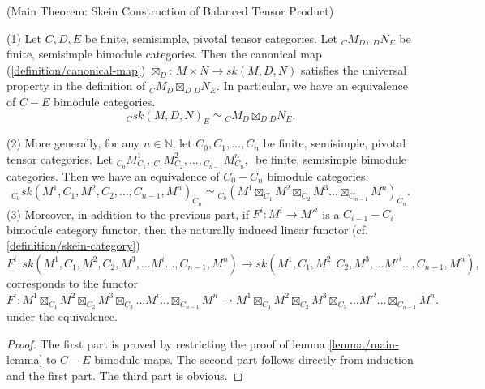 \begin{theorem} (Main Theorem: Skein Construction of Balanced Tensor Product) \label{theorem/main-theorem}

  \noindent (1) Let $C, D, E$ be finite, semisimple, pivotal tensor
  categories. Let ${}_{C}M_{D}, \, {}_{D}N_{E}$ be finite, semisimple bimodule
  categories. Then the canonical map (\ref{definition/canonical-map})
  $\boxtimes_{D}$: $M \times N \to sk(M,D,N)$ satisfies the universal property
  in the definition of ${}_{C}M_{D} \boxtimes_{D} {}_{D}N_{E}$. In particular,
  we have an equivalence of $C-E$ bimodule categories.
  \[
    {}_{C}sk(M,D,N)_{E} \simeq {}_{C}M_{D} \boxtimes_{D} {}_{D}N_{E}.
  \]

  \noindent (2) More generally, for any $n \in \mathbb{N}$, let
  $C_{0}, C_{1}, \ldots, C_{n}$ be finite, semisimple, pivotal tensor categories. Let
  ${}_{C_{0}}M^{1}_{C_{1}}, \, {}_{C_{1}}M^{2}_{C_{2}}, \ldots,
  {}_{C_{n-1}}M^{n}_{C_{n}}, \,
  $ be finite, semisimple bimodule categories.
  Then we
  have an equivalence of $C_{0}-C_{n}$ bimodule categories.
  \[
    {}_{C_{0}}sk(M^{1},C_{1},M^{2},C_{2}, \ldots, C_{n-1}, M^{n})_{C_{n}}
    \simeq
    {}_{C_{0}}(M^{1}
    \boxtimes_{C_{1}}
    M^{2}
    \boxtimes_{C_{2}}
    M^{3}
    \ldots
    \boxtimes_{C_{n-1}}
    M^{n})_{C_{n}}.
  \]
  \noindent (3) Moreover, in addition to the previous part, if
  $F^{i}: M^{i} \to M'^{i}$ is a $C_{i-1}-C_{i}$ bimodule category functor,
  then the naturally induced linear functor (cf.
  \ref{definition/skein-category})
  \[
    F^{i}:
    sk(M^{1}, C_{1}, M^{2}, C_{2}, M^{3}, \ldots M^{i} \ldots, C_{n-1}, M^{n})
    \to
    sk(M^{1}, C_{1}, M^{2}, C_{2}, M^{3}, \ldots M'^{i} \ldots, C_{n-1}, M^{n}),
  \]
  corresponds to the functor
  \[
    F^{i}:
    M^{1} \boxtimes_{C_{1}} M^{2} \boxtimes_{C_{2}} M^{3} \boxtimes_{C_{3}} \ldots M^{i} \ldots \boxtimes_{C_{n-1}} M^{n}
    \to
    M^{1} \boxtimes_{C_{1}} M^{2} \boxtimes_{C_{2}} M^{3} \boxtimes_{C_{3}} \ldots M'^{i} \ldots \boxtimes_{C_{n-1}} M^{n}.
  \]
  under the equivalence.
\end{theorem}

\begin{proof}
  The first part is proved by restricting the proof of lemma \ref{lemma/main-lemma} to $C-E$ bimodule maps.
  The second part follows directly from induction and the first part. The third part is obvious.
\end{proof}

